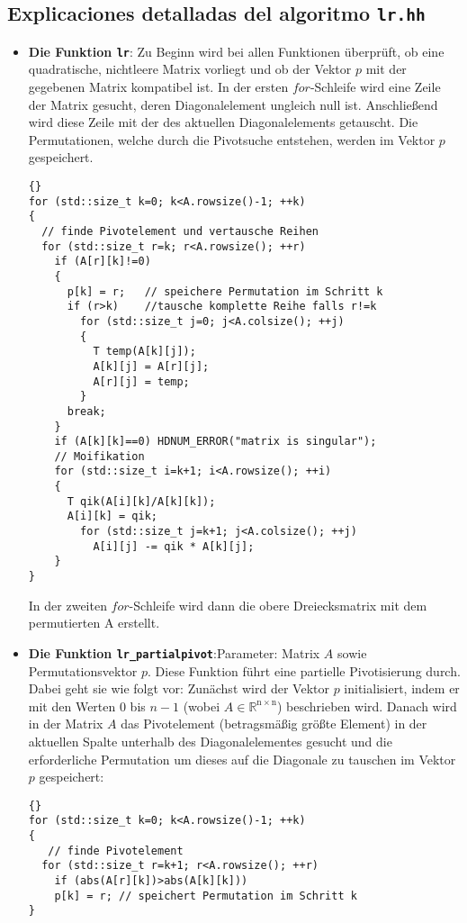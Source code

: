 \documentclass[a4paper,11pt]{article}
\theoremstyle{definition}
\begin{document}
\subsection{Explicaciones detalladas del algoritmo \lstinline{lr.hh}}
\begin{itemize}
\item \textbf{Die Funktion \lstinline{lr}}: Zu Beginn wird bei allen
  Funktionen überprüft, ob eine quadratische, nichtleere Matrix
  vorliegt und ob der Vektor $p$ mit der gegebenen Matrix kompatibel
  ist.  In der ersten $for$-Schleife wird eine Zeile der Matrix
  gesucht, deren Diagonalelement ungleich null ist. Anschließend wird
  diese Zeile mit der des aktuellen Diagonalelements getauscht. Die
  Permutationen, welche durch die Pivotsuche entstehen, werden im
  Vektor $p$ gespeichert.

{\footnotesize{\begin{lstlisting}{}
for (std::size_t k=0; k<A.rowsize()-1; ++k)
{
  // finde Pivotelement und vertausche Reihen
  for (std::size_t r=k; r<A.rowsize(); ++r)
    if (A[r][k]!=0)
    {
      p[k] = r;   // speichere Permutation im Schritt k
      if (r>k)    //tausche komplette Reihe falls r!=k
        for (std::size_t j=0; j<A.colsize(); ++j)
        {
          T temp(A[k][j]);
          A[k][j] = A[r][j];
          A[r][j] = temp;
        }
      break;
    }
    if (A[k][k]==0) HDNUM_ERROR("matrix is singular");
    // Moifikation
    for (std::size_t i=k+1; i<A.rowsize(); ++i)
    {
      T qik(A[i][k]/A[k][k]);
      A[i][k] = qik;
        for (std::size_t j=k+1; j<A.colsize(); ++j)
          A[i][j] -= qik * A[k][j];
    }
}
\end{lstlisting}}}

  In der zweiten $for$-Schleife wird dann die obere Dreiecksmatrix mit
  dem permutierten A erstellt.

\item \textbf{Die Funktion \lstinline{lr_partialpivot}}:Parameter:
  Matrix $A$ sowie Permutationsvektor $p$.  Diese Funktion führt eine
  partielle Pivotisierung durch. Dabei geht sie wie folgt vor:
  Zunächst wird der Vektor $p$ initialisiert, indem er mit den Werten
  $0$ bis $n-1$ (wobei
  $A \in \mathbb{R^{\mathrm{n}\times \mathrm{n}}}$) beschrieben
  wird. Danach wird in der Matrix $A$ das Pivotelement (betragsmäßig
  größte Element) in der aktuellen Spalte unterhalb des
  Diagonalelementes gesucht und die erforderliche Permutation um
  dieses auf die Diagonale zu tauschen im Vektor $p$ gespeichert:

{\footnotesize{\begin{lstlisting}{}
for (std::size_t k=0; k<A.rowsize()-1; ++k)
{
   // finde Pivotelement
  for (std::size_t r=k+1; r<A.rowsize(); ++r)
    if (abs(A[r][k])>abs(A[k][k]))
    p[k] = r; // speichert Permutation im Schritt k
}
\end{lstlisting}}}


\end{itemize}
\end{document}
